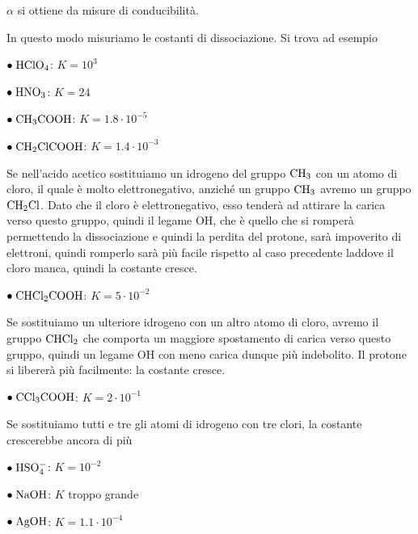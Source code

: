 $\alpha$ si ottiene da misure di conducibilità.

In questo modo misuriamo le costanti di dissociazione. Si trova ad esempio

\vspace{0.2cm}$\bullet \; \rm HClO_4$: $K=10^3$

\vspace{0.2cm}$\bullet \; \rm HNO_3$: $K=24$

\vspace{0.2cm}$\bullet \; \rm CH_3COOH$: $K=1.8 \cdot 10^{-5}$

\vspace{0.2cm}$\bullet \; \rm CH_2ClCOOH$: $K=1.4 \cdot 10^{-3}$

\vspace{0.2cm}Se nell'acido acetico sostituiamo un idrogeno del gruppo $\rm CH_3$ con un atomo di cloro, il quale è molto elettronegativo, anziché un gruppo $\rm CH_3$ avremo un gruppo $\rm CH_2Cl$. Dato che il cloro è elettronegativo, esso tenderà ad attirare la carica verso questo gruppo, quindi il legame OH, che è quello che si romperà permettendo la dissociazione e quindi la perdita del protone, sarà impoverito di elettroni, quindi romperlo sarà più facile rispetto al caso precedente laddove il cloro manca, quindi la costante cresce.

\vspace{0.2cm}$\bullet \; \rm CHCl_2COOH$: $K=5 \cdot 10^{-2}$

\vspace{0.2cm}Se sostituiamo un ulteriore idrogeno con un altro atomo di cloro, avremo il gruppo $\rm CHCl_2$ che comporta un maggiore spostamento di carica verso questo gruppo, quindi un legame OH con meno carica dunque più indebolito. Il protone si libererà più facilmente: la costante cresce.

\vspace{0.2cm}$\bullet \; \rm CCl_3COOH$: $K=2 \cdot 10^{-1}$

\vspace{0.2cm}Se sostituiamo tutti e tre gli atomi di idrogeno con tre clori, la costante crescerebbe ancora di più

\vspace{0.2cm}$\bullet \; \rm HSO_4^-$: $K=10^{-2}$

\vspace{0.2cm}$\bullet \; \rm NaOH$: $K$ troppo grande

\vspace{0.2cm}$\bullet \; \rm AgOH$: $K=1.1 \cdot 10^{-4}$


